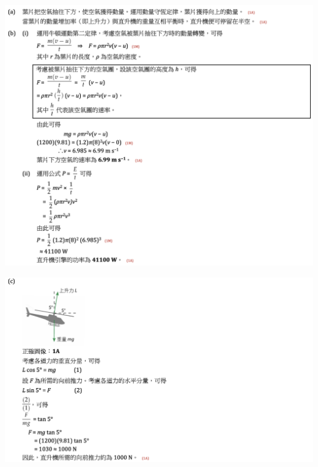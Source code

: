{
    \clearpage{}
}{
    \sol
    \par{\par\centering\includegraphics[width=.9\textwidth]{./img/ch5_momentum_lq_2024-05-11-22-43-32.png}\par}
    \par{\par\centering\includegraphics[width=.9\textwidth]{./img/ch5_momentum_lq_2024-05-11-22-43-49.png}\par}
}

